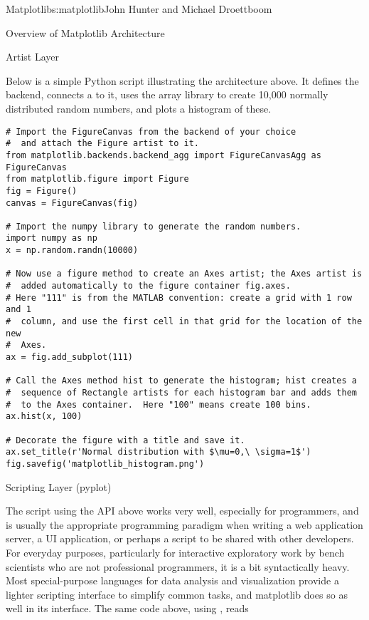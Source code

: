 \begin{aosachapter}{Matplotlib}{s:matplotlib}{John Hunter and Michael Droettboom}
\begin{aosasect1}{Overview of Matplotlib Architecture}
\begin{aosasect2}{Artist Layer}
\end{aosasect2}

Below is a simple Python script illustrating the architecture above.
It defines the backend, connects a  to it, uses the array
library  to create 10,000 normally distributed random numbers,
and plots a histogram of these.


\begin{verbatim}
# Import the FigureCanvas from the backend of your choice
#  and attach the Figure artist to it.
from matplotlib.backends.backend_agg import FigureCanvasAgg as FigureCanvas
from matplotlib.figure import Figure
fig = Figure()
canvas = FigureCanvas(fig)

# Import the numpy library to generate the random numbers.
import numpy as np
x = np.random.randn(10000)

# Now use a figure method to create an Axes artist; the Axes artist is
#  added automatically to the figure container fig.axes.
# Here "111" is from the MATLAB convention: create a grid with 1 row and 1
#  column, and use the first cell in that grid for the location of the new
#  Axes.
ax = fig.add_subplot(111)

# Call the Axes method hist to generate the histogram; hist creates a
#  sequence of Rectangle artists for each histogram bar and adds them
#  to the Axes container.  Here "100" means create 100 bins.
ax.hist(x, 100)

# Decorate the figure with a title and save it.
ax.set_title(r'Normal distribution with $\mu=0,\ \sigma=1$')
fig.savefig('matplotlib_histogram.png')
\end{verbatim}

\begin{aosasect2}{Scripting Layer (pyplot)}

The script using the API above works very well, especially for programmers,
and is usually the appropriate programming paradigm when writing a
web application server, a UI application, or perhaps a script to be
shared with other developers.  For everyday purposes, particularly
for interactive exploratory work by bench scientists who are not
professional programmers, it is a bit syntactically heavy.  Most
special-purpose languages for data analysis and visualization
provide a lighter scripting interface to simplify common tasks, and
matplotlib does so as well in its 
interface.  The same code above, using , reads


\end{aosasect2}
\end{aosasect1}
\end{aosachapter}

